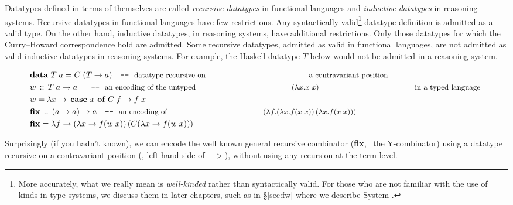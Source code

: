 Datatypes defined in terms of themselves are called \emph{recursive datatypes}
in functional languages and \emph{inductive datatypes} in reasoning systems.
Recursive datatypes in functional languages have few restrictions.
Any syntactically valid\footnote{
        More accurately, what we really mean is \emph{well-kinded} rather than
        syntactically valid. 
        For those who are not familiar with the use of kinds in type systems, 
        we discuss them in later chapters, such as
        in \S\ref{sec:fw} where we describe System \Fw.}
datatype definition is admitted as a valid type. On the other hand,
inductive datatypes, in reasoning systems, have additional restrictions.
Only those datatypes for which the Curry--Howard correspondence hold are
admitted. Some recursive datatypes, admitted as valid in functional languages,
are not admitted as valid inductive datatypes in reasoning systems. For example,
the Haskell datatype $T$ below would not be admitted in a reasoning system.
\vspace*{-1.5em}
\begin{singlespace}
\begin{align*}
& \textbf{data}~T\;a = C\;(T -> a) \quad
          \texttt{-}\texttt{-}~\text{\small datatype recursive on
                                        a contravariant position} \\
& w \,::\, T\;a -> a ~~ \quad
          \texttt{-}\texttt{-}~\text{\small an encoding of the untyped
                                     $(\lambda x.x\;x)$
                                     in a typed language}~ \\
& w = \lambda x -> \,\textbf{case}~x~\textbf{of}~C\;f -> f\;x \\
& \textbf{fix} \,::\, (a -> a) -> a \quad
          \texttt{-}\texttt{-}~\text{\small an encoding of 
                                     $(\lambda f.(\lambda x.f(x\;x))\,
                                                 (\lambda x.f(x\;x)))$} \\
& \textbf{fix} = \lambda f -> (\lambda x -> f (w\;x))\,(C(\lambda x -> f (w\;x)))
\end{align*}
\end{singlespace}\noindent
Surprisingly (if you hadn't known), we can encode the well known
general recursive combinator (\textbf{fix}, \aka\ the \textsf{Y}-combinator)
using a datatype recursive on a contravariant position (\ie, left-hand side of
$->$), without using any recursion at the term level.
